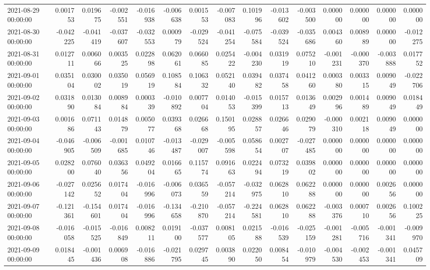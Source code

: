 \begin{tabular}{lrrrrrrrrrrrrrr}
2021-08-29 00:00:00 & 0.001753 & 0.019675 & -0.002551 & -0.016938 & -0.006638 & 0.001553 & -0.007083 & 0.101996 & -0.013602 & -0.003500 & 0.000000 & 0.000000 & 0.000000 & 0.000000 \\
2021-08-30 00:00:00 & -0.042225 & -0.041419 & -0.037607 & -0.032553 & 0.000979 & -0.029524 & -0.041254 & -0.075584 & -0.039524 & -0.035686 & 0.004360 & 0.008989 & 0.000000 & -0.012275 \\
2021-08-31 00:00:00 & 0.012711 & 0.006066 & 0.003525 & 0.022898 & 0.062061 & 0.066085 & 0.025422 & -0.004230 & 0.031919 & 0.075210 & -0.001231 & -0.000370 & -0.003888 & 0.017752 \\
2021-09-01 00:00:00 & 0.035104 & 0.030002 & 0.035019 & 0.056919 & 0.108584 & 0.106332 & 0.052140 & 0.039482 & 0.037458 & 0.041260 & 0.000380 & 0.003315 & 0.009049 & -0.022706 \\
2021-09-02 00:00:00 & 0.031890 & 0.013084 & 0.008984 & 0.000339 & -0.010892 & 0.007704 & 0.014053 & -0.015399 & 0.015713 & 0.013649 & 0.002996 & 0.001489 & 0.009049 & 0.018449 \\
2021-09-03 00:00:00 & 0.001686 & 0.071143 & 0.014879 & 0.005077 & 0.039368 & 0.026668 & 0.150195 & 0.028857 & 0.026646 & 0.029079 & -0.000310 & 0.002118 & 0.009049 & 0.000000 \\
2021-09-04 00:00:00 & -0.046905 & -0.006509 & -0.001685 & 0.010746 & -0.013487 & -0.029007 & -0.005598 & 0.058654 & 0.002707 & -0.027485 & 0.000000 & 0.000000 & 0.000000 & 0.000000 \\
2021-09-05 00:00:00 & 0.028200 & 0.076040 & 0.036356 & 0.049204 & 0.016665 & 0.115774 & 0.091663 & 0.022494 & 0.073219 & 0.039802 & 0.000000 & 0.000000 & 0.000000 & 0.000000 \\
2021-09-06 00:00:00 & -0.027142 & 0.025652 & 0.017404 & -0.016996 & -0.006073 & 0.036559 & -0.057214 & -0.032975 & 0.062810 & 0.062288 & 0.000000 & 0.000000 & 0.002656 & 0.000000 \\
2021-09-07 00:00:00 & -0.121361 & -0.154601 & 0.017404 & -0.016996 & -0.134658 & -0.210870 & -0.057214 & -0.224581 & 0.062810 & 0.062288 & -0.003376 & 0.000710 & 0.002656 & 0.100225 \\
2021-09-08 00:00:00 & -0.016058 & -0.015525 & -0.016849 & 0.008211 & 0.019100 & -0.037577 & 0.008105 & 0.021588 & -0.016539 & -0.025159 & -0.001281 & -0.005716 & -0.001341 & -0.009970 \\
2021-09-09 00:00:00 & 0.018445 & -0.001436 & 0.006908 & -0.016886 & -0.021795 & 0.029745 & 0.003890 & 0.022050 & 0.008454 & -0.010979 & -0.004530 & -0.002453 & -0.001341 & 0.045709 \\

\end{tabular}
